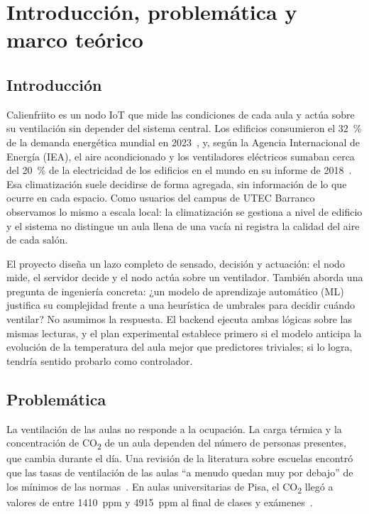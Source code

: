 \documentclass[manuscript,screen,nonacm,natbib=false]{acmart}
\newcommand{\COdos}{CO\textsubscript{2}}
\begin{document}
\maketitle

\section{Introducción, problemática y marco teórico}
\label{sec:intro}

\subsection{Introducción}
\label{sec:introduccion}
Calienfriito es un nodo IoT que mide las condiciones de cada aula y actúa sobre su ventilación sin depender del sistema central. Los edificios consumieron el 32~\% de la demanda energética mundial en 2023~\cite{unep2025gsr}, y, según la Agencia Internacional de Energía (IEA), el aire acondicionado y los ventiladores eléctricos sumaban cerca del 20~\% de la electricidad de los edificios en el mundo en su informe de 2018~\cite{iea2018cooling}. Esa climatización suele decidirse de forma agregada, sin información de lo que ocurre en cada espacio. Como usuarios del campus de UTEC Barranco observamos lo mismo a escala local: la climatización se gestiona a nivel de edificio y el sistema no distingue un aula llena de una vacía ni registra la calidad del aire de cada salón.

El proyecto diseña un lazo completo de sensado, decisión y actuación: el nodo mide, el servidor decide y el nodo actúa sobre un ventilador. También aborda una pregunta de ingeniería concreta: ¿un modelo de aprendizaje automático (ML) justifica su complejidad frente a una heurística de umbrales para decidir cuándo ventilar? No asumimos la respuesta. El backend ejecuta ambas lógicas sobre las mismas lecturas, y el plan experimental establece primero si el modelo anticipa la evolución de la temperatura del aula mejor que predictores triviales; si lo logra, tendría sentido probarlo como controlador.

\subsection{Problemática}
La ventilación de las aulas no responde a la ocupación. La carga térmica y la concentración de \COdos{} de un aula dependen del número de personas presentes, que cambia durante el día. Una revisión de la literatura sobre escuelas encontró que las tasas de ventilación de las aulas ``a menudo quedan muy por debajo'' de los mínimos de las normas~\cite{fisk2017ventilation}. En aulas universitarias de Pisa, el \COdos{} llegó a valores de entre 1410~ppm y 4915~ppm al final de clases y exámenes~\cite{franco2020co2}.
\end{document}
